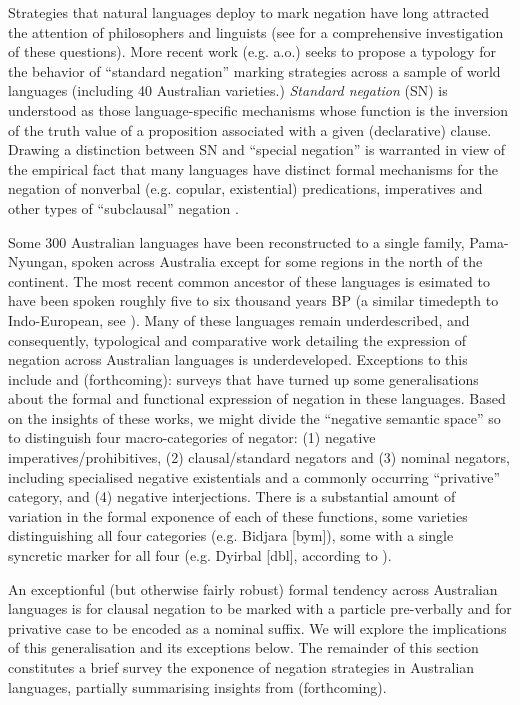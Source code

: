 \documentclass[output=paper,draft,draftmode,colorlinks,citecolor=brown]{langscibook}
\begin{document}
Strategies that natural languages deploy to mark negation have long attracted the attention of philosophers and linguists (see \citealt{Horn1989} for a comprehensive investigation of these questions). More recent work (e.g. \citealt{Miestamo2005} a.o.) seeks to propose a typology for the behavior of ``standard negation'' marking strategies across a sample of world languages (including 40 Australian varieties.) \textit{Standard negation} (SN) is understood as those language-specific mechanisms whose function is the inversion of the truth value of a proposition associated with a given (declarative) clause. Drawing a distinction between SN and ``special negation'' is warranted in view of the empirical fact that many languages have distinct formal mechanisms for the negation of nonverbal (e.g. copular, existential) predications, imperatives and other types of ``subclausal'' negation \citep{Miestamo2007,HornWansing2017,Veselinova2013,AuweraLejeune2005}.

Some 300 Australian languages have been reconstructed to a single family, Pama-Nyungan, spoken across Australia except for some regions in the north of the continent. The most recent common ancestor of these languages is esimated to have been spoken roughly five to six thousand years \textsc{BP} (a similar timedepth to Indo-European, see \citealt[742]{BouckaertBowern2018}). Many of these languages remain underdescribed, and consequently, typological and comparative work detailing the expression of negation across Australian languages is underdeveloped. Exceptions to this include \citealp{Dixon2002a} and \citeauthor{PhillipsFCb} (forthcoming): surveys that have turned up some generalisations about the formal and functional expression of negation in these languages. Based on the insights of these works, we might divide the ``negative semantic space'' so to distinguish four macro-categories of negator: (1) negative imperatives\slash prohibitives, (2) clausal\slash standard negators and (3) nominal negators, including specialised negative existentials and a commonly occurring ``privative'' category, and (4) negative interjections. There is a substantial amount of variation in the formal exponence of each of these functions, some varieties distinguishing all four categories  (e.g. Bidjara [bym]), some with a single syncretic marker for all four (e.g. Dyirbal [dbl], according to \citealp[84--table 3.3]{Dixon2002a}). 

\hspace*{-3pt}An exceptionful (but otherwise fairly robust) formal tendency across Australian languages is for clausal negation to be marked with a particle pre-verbally and for privative case to be encoded as a nominal suffix. We will explore the implications of this generalisation and its exceptions below. The remainder of this section constitutes a brief survey the exponence of negation strategies in Australian languages, partially summarising insights from \citeauthor{PhillipsFCb} (forthcoming).
\end{document}
